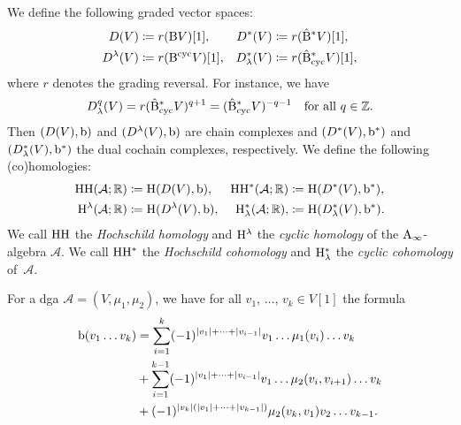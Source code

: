 \documentclass[\MainFolder/Text.tex]{subfiles}
\begin{document}
\begin{Definition}
We define the following graded vector spaces:
\begin{align*}
D(V) &\coloneqq r(\mathrm{B} V)[1], & D^*(V) &\coloneqq r(\hat{\mathrm{B}}^* V)[1], \\ D^\lambda(V) &\coloneqq r(\mathrm{B}^{\mathrm{cyc}} V)[1], & D_\lambda^*(V) &\coloneqq r(\hat{\mathrm{B}}_{\mathrm{cyc}}^* V)[1], \end{align*}
where $r$ denotes the grading reversal.
For instance, we have
$$ D_\lambda^q(V) = r(\hat{\mathrm{B}}_{\mathrm{cyc}}^* V)^{q+1} = (\hat{\mathrm{B}}_{\mathrm{cyc}}^* V)^{-q-1}\quad \text{for all } q\in \mathbb{Z}.$$
Then $(D(V),\mathrm{b})$ and $(D^\lambda(V),\mathrm{b})$ are chain complexes and $(D^*(V),\mathrm{b}^*)$ and $(D_\lambda^*(V),\mathrm{b}^*)$ the dual cochain complexes, respectively.
We define the following (co)homologies:
\begin{align*}
\mathrm{H}\mathrm{H}(\mathcal{A};\mathbb{R})& \coloneqq \mathrm{H}(D(V), \mathrm{b}), & \mathrm{H}\mathrm{H}^*(\mathcal{A};\mathbb{R}) &\coloneqq \mathrm{H}(D^*(V),\mathrm{b}^*),\\  
\mathrm{H}^\lambda(\mathcal{A};\mathbb{R})& \coloneqq \mathrm{H}(D^\lambda(V), \mathrm{b}), & \mathrm{H}^*_\lambda(\mathcal{A};\mathbb{R}), &\coloneqq \mathrm{H}(D^*_\lambda(V),\mathrm{b}^*).
\end{align*}
We call $\mathrm{H}\mathrm{H}$ the \emph{Hochschild homology} and $\mathrm{H}^\lambda$ the \emph{cyclic homology} of the $\mathrm{A}_\infty$-algebra $\mathcal{A}$. We call $\mathrm{H}\mathrm{H}^*$ the \emph{Hochschild cohomology} and $\mathrm{H}_\lambda^*$ the \emph{cyclic cohomology} of~$\mathcal{A}$.
\end{Definition}

For a dga $\mathcal{A} = (V,\mu_1,\mu_2)$, we have for all $v_1$, $\dotsc$, $v_k\in V[1]$ the formula
\begin{align*}
 \mathrm{b}(v_1 \dots v_k) &= \sum_{i=1}^k (-1)^{|v_1| + \dotsb + |v_{i-1}|} v_1 \dots \mu_1(v_i) \dots v_k  \\ 
   &+ \sum_{i=1}^{k-1} (-1)^{|v_1| + \dotsb + |v_{i-1}|} v_1 \dots \mu_2(v_i,v_{i+1}) \dots v_k \\
   &+ (-1)^{|v_k|(|v_1| + \dotsb + |v_{k-1}|)} \mu_2(v_k,v_1)v_2\dots v_{k-1}.
\end{align*}
\end{document}
